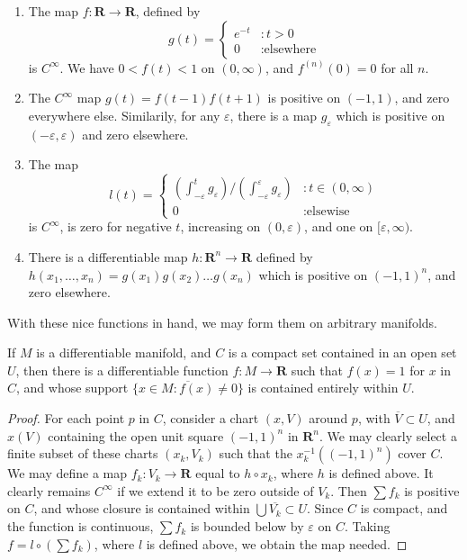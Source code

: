 \begin{enumerate}
    \item The map $f:\mathbf{R} \to \mathbf{R}$, defined by
    \[
    g(t) =
    \begin{cases}
        e^{-t} & : t > 0\\
        0 & : \text{elsewhere}
    \end{cases}
    \]
    is $C^\infty$. We have $0 < f(t) < 1$ on $(0,\infty)$, and $f^{(n)}(0) = 0$ for all $n$.
    \item The $C^\infty$ map $g(t) = f(t-1)f(t+1)$ is positive on $(-1,1)$, and zero everywhere else. Similarily, for any $\varepsilon$, there is a map $g_\varepsilon$ which is positive on $(-\varepsilon, \varepsilon)$ and zero elsewhere.
    \item The map 
    \[ l(t) = \begin{cases}
        \left(\int_{-\varepsilon}^t g_\varepsilon \right)/\left(\int_{-\varepsilon}^\varepsilon g_\varepsilon \right) & : t \in (0, \infty) \\
        0 & : \text{elsewise}
    \end{cases} \]
    is $C^\infty$, is zero for negative $t$, increasing on $(0, \varepsilon)$, and one on $[\varepsilon, \infty)$.
    \item There is a differentiable map $h:\mathbf{R}^n \to \mathbf{R}$ defined by $h(x_1, \dots, x_n) = g(x_1) g(x_2) \dots g(x_n)$ which is positive on $(-1, 1)^n$, and zero elsewhere.
\end{enumerate}

With these nice functions in hand, we may form them on arbitrary manifolds.

\begin{theorem}
    If $M$ is a differentiable manifold, and $C$ is a compact set contained in an open set $U$, then there is a differentiable function $f:M \to \mathbf{R}$ such that $f(x) = 1$ for $x$ in $C$, and whose support $\overline{\{ x \in M : f(x) \neq 0 \}}$ is contained entirely within $U$.
\end{theorem}
\begin{proof}
    For each point $p$ in $C$, consider a chart $(x,V)$ around $p$, with $\overline{V} \subset U$, and $x(V)$ containing the open unit square $(-1,1)^n$ in $\mathbf{R}^n$. We may clearly select a finite subset of these charts $(x_k,V_k)$ such that the $x_k^{-1}((-1,1)^n)$ cover $C$. We may define a map $f_k:V_k \to \mathbf{R}$ equal to $h \circ x_k$, where $h$ is defined above. It clearly remains $C^\infty$ if we extend it to be zero outside of $V_k$. Then $\sum f_k$ is positive on $C$, and whose closure is contained within $\bigcup \overline{V_k} \subset U$. Since $C$ is compact, and the function is continuous, $\sum f_k$ is bounded below by $\varepsilon$ on $C$. Taking $f = l \circ (\sum f_k)$, where $l$ is defined above, we obtain the map needed.
\end{proof}

